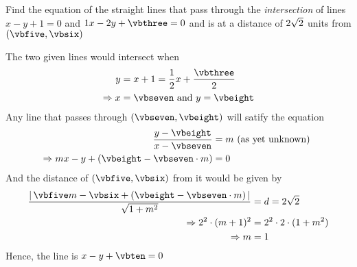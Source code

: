 \question[4] Find the equation of the straight lines that pass through the \textit{intersection} of lines 
$x-y+1 = 0$ and $\vbone x - \vbtwo y + \vbthree = 0$ and is at a distance of 
$2\sqrt{2}$ units from $(\vbfive, \vbsix)$


\watchout

\ifprintanswers

\fi 

\begin{solution}[\halfpage]
	The two given lines would intersect when
	\begin{align}
		y &= x + 1 = \dfrac{\vbone}{\vbtwo}x + \dfrac{\vbthree}{\vbtwo} \\
		\Rightarrow x &= \vbseven \text{ and } y = \vbeight
	\end{align}
	Any line that passes through $(\vbseven, \vbeight)$ will satify the equation
	\begin{align}
		\dfrac{y-\vbeight}{x-\vbseven} &= m \text{ (as yet unknown) } \\
		\Rightarrow mx - y + (\vbeight - \vbseven \cdot m) &= 0
	\end{align}
	And the distance of $(\vbfive, \vbsix)$ from it would be given by 
	\begin{align}
		\dfrac{\vert\, \vbfive m - \vbsix + (\vbeight - \vbseven\cdot m)\,\vert}{\sqrt{1 + m^2}} &= d = \vbfour\sqrt{2}\\
		\Rightarrow \vbfour^2\cdot(m+1)^2 &= \vbfour^2\cdot 2\cdot(1 + m^2) \\
		\Rightarrow m &= 1 
	\end{align}
	Hence, the line is $x-y+\vbten = 0$
\end{solution}
